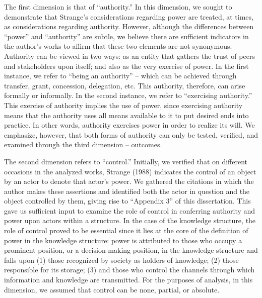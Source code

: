 The first dimension is that of ``authority.'' In this dimension, we sought to demonstrate that Strange's considerations regarding power are treated, at times, as considerations regarding authority. However, although the differences between ``power'' and ``authority'' are subtle, we believe there are sufficient indicators in the author's works to affirm that these two elements are not synonymous. Authority can be viewed in two ways: as an entity that gathers the trust of peers and stakeholders upon itself; and also as the very exercise of power. In the first instance, we refer to ``being an authority'' -- which can be achieved through transfer, grant, concession, delegation, etc. This authority, therefore, can arise formally or informally. In the second instance, we refer to ``exercising authority.'' This exercise of authority implies the use of power, since exercising authority means that the authority uses all means available to it to put desired ends into practice. In other words, authority exercises power in order to realize its will. We emphasize, however, that both forms of authority can only be tested, verified, and examined through the third dimension -- outcomes.

The second dimension refers to ``control.'' Initially, we verified that on different occasions in the analyzed works, Strange (1988) indicates the control of an object by an actor to denote that actor's power. We gathered the citations in which the author makes these assertions and identified both the actor in question and the object controlled by them, giving rise to ``Appendix 3'' of this dissertation. This gave us sufficient input to examine the role of control in conferring authority and power upon actors within a structure. In the case of the knowledge structure, the role of control proved to be essential since it lies at the core of the definition of power in the knowledge structure: power is attributed to those who occupy a prominent position, or a decision-making position, in the knowledge structure and falls upon (1) those recognized by society as holders of knowledge; (2) those responsible for its storage; (3) and those who control the channels through which information and knowledge are transmitted. For the purposes of analysis, in this dimension, we assumed that control can be none, partial, or absolute.

